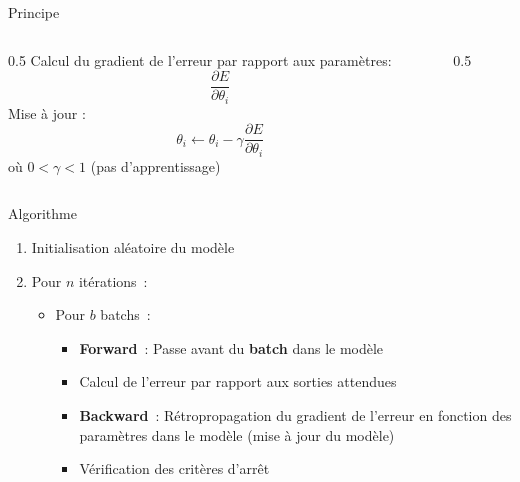 
\begin{frame}{Principe}
  \begin{columns}
    \begin{column}{0.5\tw}
      Calcul du gradient de l'erreur par rapport aux paramètres:
      \[
        \frac{\partial{E}}{\partial{\theta_i}}
      \]
      Mise à jour :
      \[
        \theta_i \leftarrow \theta_i - \gamma\frac{\partial{E}}{\partial{\theta_i}}
      \]
      où $0 < \gamma < 1$ (pas d'apprentissage)
    \end{column}
    \begin{column}{0.5\tw}
    \end{column}
  \end{columns}
\end{frame}

\begin{frame}{Algorithme}
  \begin{enumerate}[<+->]
    \item Initialisation aléatoire du modèle
    \item Pour $n$ itérations~:
      \begin{itemize}
        \item Pour $b$ batchs~:
        \begin{itemize}
          \item \textbf{Forward}~: Passe avant du \textbf{batch} dans le modèle
          \item Calcul de l'erreur par rapport aux sorties attendues
          \item \textbf{Backward}~: Rétropropagation du gradient de l'erreur en fonction des paramètres dans le modèle (mise à jour du modèle)
          \item Vérification des critères d'arrêt
        \end{itemize}
      \end{itemize}
  \end{enumerate}
\end{frame}


